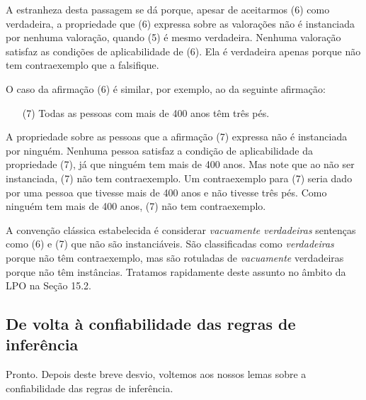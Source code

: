 A estranheza desta passagem se dá porque, apesar de aceitarmos (6) como verdadeira, a propriedade que (6) expressa sobre as valorações não é instanciada por nenhuma valoração, quando (5) é mesmo verdadeira. Nenhuma valoração satisfaz as condições de aplicabilidade de (6). Ela é verdadeira apenas porque não tem contraexemplo que a falsifique.

O caso da afirmação (6) é similar, por exemplo, ao da seguinte afirmação:
\begin{itemize}
	\item[(7)] Todas as pessoas com mais de 400 anos têm três pés.
\end{itemize}

A propriedade sobre as pessoas que a afirmação (7) expressa não é instanciada por ninguém. Nenhuma pessoa satisfaz a condição de aplicabilidade da propriedade (7), já que ninguém tem mais de 400 anos.
Mas note que ao não ser instanciada, (7) não tem contraexemplo.
Um contraexemplo para (7) seria dado por uma pessoa que tivesse mais de 400 anos e não tivesse três pés.
Como ninguém tem mais de 400 anos, (7) não tem contraexemplo.

A convenção clássica estabelecida é considerar \textit{vacuamente verdadeiras} sentenças como (6) e (7) que não são instanciáveis.
São classificadas como \textit{verdadeiras} porque não têm contraexemplo, mas são rotuladas de \textit{vacuamente} verdadeiras porque não têm instâncias.
Tratamos rapidamente deste assunto no âmbito da LPO na Seção 15.2.


\subsection{De volta à confiabilidade das regras de inferência}

Pronto. Depois deste breve desvio, voltemos aos nossos lemas sobre a confiabilidade das regras de inferência.


